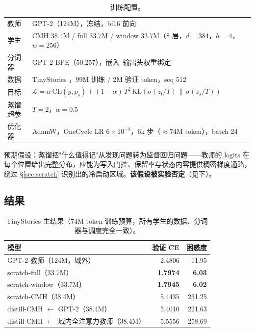\documentclass[11pt]{ctexart}
\newcommand{\cmh}{CMH}
\begin{document}
\begin{table}[h]
\centering
\caption{训练配置。}
\label{tab:setup}
\begin{tabular}{ll}
\toprule
教师 & GPT-2（124M），冻结，bf16 前向 \\
学生 & \cmh{} 38.4M / full 33.7M / window 33.7M（8 层，$d{=}384$，$h{=}4$，$w{=}256$） \\
分词器 & GPT-2 BPE（50{,}257），嵌入--输出头权重绑定 \\
数据 & TinyStories \cite{eldan2023tinystories}，99M 训练 / 2M 验证 token，seq 512 \\
目标 & $\mathcal{L} = \alpha\,\mathrm{CE}(y, p_s) + (1-\alpha)\,T^2\,\mathrm{KL}(\sigma(z_t/T)\,\|\,\sigma(z_s/T))$ \\
蒸馏超参 & $T = 2$，$\alpha = 0.5$ \\
优化器 & AdamW，OneCycle LR $6{\times}10^{-4}$，6k 步（$\approx$74M token），batch 24 \\
\bottomrule
\end{tabular}
\end{table}

预期假设：蒸馏把"什么值得记"从发现问题转为监督回归问题——教师的 logits 在每个位置给出完整分布，应能为写入门控、保留率与状态内容提供稠密梯度通路，绕过 \S\ref{sec:scratch} 识别出的冷启动区域。\textbf{该假设被实验否定}（见下）。

\subsection{结果}

\begin{table}[h]
\centering
\caption{TinyStories 主结果（74M token 训练预算，所有学生的数据、分词器与调度完全一致）。}
\label{tab:main}
\begin{tabular}{lrr}
\toprule
模型 & 验证 CE & 困惑度 \\
\midrule
GPT-2 教师（124M，域外） & 2.4806 & 11.95 \\
\midrule
scratch-full（33.7M） & \textbf{1.7974} & \textbf{6.03} \\
scratch-window（33.7M） & \textbf{1.7945} & \textbf{6.02} \\
scratch-\cmh{}（38.4M） & 5.4435 & 231.25 \\
\midrule
distill-\cmh{} $\leftarrow$ GPT-2（38.4M） & 5.4010 & 221.63 \\
distill-\cmh{} $\leftarrow$ 域内全注意力教师（38.4M） & 5.5556 & 258.69 \\
\bottomrule
\end{tabular}
\end{table}
\end{document}
